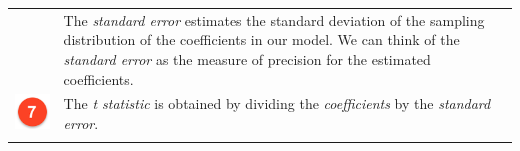 \documentclass[]{article}
\theoremstyle{definition}
\theoremstyle{definition}
\theoremstyle{definition}
\theoremstyle{remark}
\begin{document}
\begin{longtable}[]{@{}ll@{}}
\begin{minipage}[t]{0.08\columnwidth}
\end{minipage} & \begin{minipage}[t]{0.86\columnwidth}\raggedright\strut
The \emph{standard error} estimates the standard deviation of the
sampling distribution of the coefficients in our model. We can think of
the \emph{standard error} as the measure of precision for the estimated
coefficients.\strut
\end{minipage}\tabularnewline
\begin{minipage}[t]{0.08\columnwidth}\raggedright\strut
\includegraphics[width=1.00000\textwidth]{./img/circle7.png}\strut
\end{minipage} & \begin{minipage}[t]{0.86\columnwidth}\raggedright\strut
The \emph{t statistic} is obtained by dividing the \emph{coefficients}
by the \emph{standard error}.\strut
\end{minipage}\tabularnewline
\begin{minipage}[t]{0.08\columnwidth}\raggedright\strut

\end{minipage}
\end{longtable}
\end{document}
